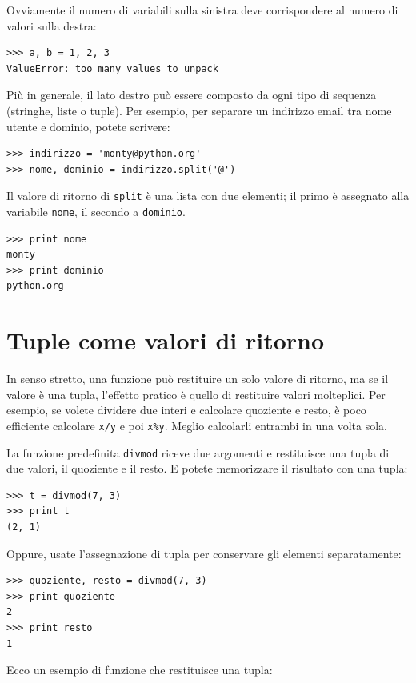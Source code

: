 \documentclass[10pt]{book}
\begin{document}
Ovviamente il numero di variabili sulla sinistra deve corrispondere al
   numero di valori sulla destra:

\begin{verbatim}
>>> a, b = 1, 2, 3
ValueError: too many values to unpack
\end{verbatim}
%
Più in generale, il lato destro può essere composto da ogni tipo di sequenza (stringhe, liste o tuple). Per esempio, per separare un indirizzo email tra nome utente e dominio, potete scrivere:

\begin{verbatim}
>>> indirizzo = 'monty@python.org'
>>> nome, dominio = indirizzo.split('@')
\end{verbatim}
%
Il valore di ritorno di {\tt split} è una lista con due elementi; il primo è assegnato alla variabile {\tt nome}, il secondo a {\tt dominio}.

\begin{verbatim}
>>> print nome
monty
>>> print dominio
python.org
\end{verbatim}
%

\section{Tuple come valori di ritorno}

In senso stretto, una funzione può restituire un solo valore di ritorno, ma se il valore è una tupla, l'effetto pratico è quello di restituire valori molteplici. Per esempio, se volete dividere due interi e calcolare quoziente e resto, è poco efficiente calcolare {\tt x/y} e poi {\tt x\%y}.  Meglio calcolarli entrambi in una volta sola.

La funzione predefinita {\tt divmod} riceve due argomenti e restituisce una tupla di due valori, il quoziente e il resto. E potete memorizzare il risultato con una tupla:

\begin{verbatim}
>>> t = divmod(7, 3)
>>> print t
(2, 1)
\end{verbatim}
%
Oppure, usate l'assegnazione di tupla per conservare gli elementi separatamente:

\begin{verbatim}
>>> quoziente, resto = divmod(7, 3)
>>> print quoziente
2
>>> print resto
1
\end{verbatim}
%
Ecco un esempio di funzione che restituisce una tupla:
\end{document}
